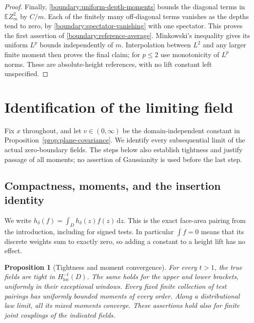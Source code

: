 \documentclass[11pt]{article}
\newcommand{\E}{\mathbb E}
\newcommand{\dd}{\,\mathrm d}
\newtheorem{proposition}[theorem]{Proposition}
\theoremstyle{definition}
\theoremstyle{remark}
\numberwithin{equation}{section}
\begin{document}
\begin{proof}
Finally, \eqref{boundary:uniform-depth-moments} bounds the diagonal
terms in $\E Z_m^2$ by $C/m$.  Each of the finitely many off-diagonal
terms vanishes as the depths tend to zero, by
\eqref{boundary:spectator-vanishing} with one spectator.  This proves
the first assertion of \eqref{boundary:reference-average}.
Minkowski's inequality gives its uniform $L^p$ bounds independently
of $m$.  Interpolation between $L^2$ and any larger finite moment
then proves the final claim; for $p\le2$ use monotonicity of
$L^p$ norms.  These are absolute-height references, with no lift
constant left unspecified.
\end{proof}

\section{Identification of the limiting field}
\label{sec:limit}

Fix \(x\) throughout, and let \(v\in(0,\infty)\) be the
domain-independent constant in Proposition~\ref{prop:plane-covariance}.
We identify every subsequential limit of the actual zero-boundary
fields.  The steps below also establish tightness and justify passage
of all moments; no assertion of Gaussianity is used before the last
step.

\subsection{Compactness, moments, and the insertion identity}

We write \(h_\delta(f)=\int_D h_\delta(z)f(z)\dd z\).
This is the exact face-area pairing from the introduction, including
for signed tests.  In particular \(\int f=0\) means that its discrete
weights sum to exactly zero, so adding a constant to a height lift has
no effect.

\begin{proposition}[Tightness and moment convergence]
\label{prop:tightness}
For every \(t>1\), the true fields are tight in
\(H^{-t}_{\mathrm{loc}}(D)\).  The same holds for the upper and lower
brackets, uniformly in their exceptional windows.  Every fixed finite
collection of test pairings has uniformly bounded moments of every
order.  Along a distributional law limit, all its mixed moments
converge.  These assertions hold also for finite joint couplings of
the indicated fields.
\end{proposition}
\end{document}
